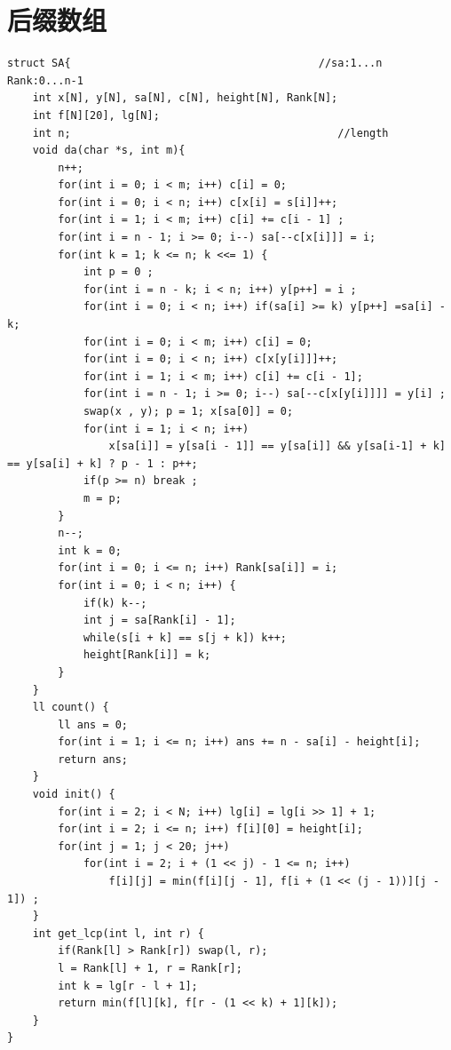 \documentclass[a4paper,11pt,twoside,fontset = fandol,UTF8]{ctexbook} %
\begin{document}
	\section{后缀数组}
	\begin{lstlisting}
struct SA{                                       //sa:1...n  Rank:0...n-1
    int x[N], y[N], sa[N], c[N], height[N], Rank[N];
    int f[N][20], lg[N];
    int n;                                          //length
    void da(char *s, int m){
        n++;
        for(int i = 0; i < m; i++) c[i] = 0;
        for(int i = 0; i < n; i++) c[x[i] = s[i]]++;
        for(int i = 1; i < m; i++) c[i] += c[i - 1] ;
        for(int i = n - 1; i >= 0; i--) sa[--c[x[i]]] = i;
        for(int k = 1; k <= n; k <<= 1) {
            int p = 0 ;
            for(int i = n - k; i < n; i++) y[p++] = i ;
            for(int i = 0; i < n; i++) if(sa[i] >= k) y[p++] =sa[i] - k;
            for(int i = 0; i < m; i++) c[i] = 0;
            for(int i = 0; i < n; i++) c[x[y[i]]]++;
            for(int i = 1; i < m; i++) c[i] += c[i - 1];
            for(int i = n - 1; i >= 0; i--) sa[--c[x[y[i]]]] = y[i] ;
            swap(x , y); p = 1; x[sa[0]] = 0;
            for(int i = 1; i < n; i++)
                x[sa[i]] = y[sa[i - 1]] == y[sa[i]] && y[sa[i-1] + k] == y[sa[i] + k] ? p - 1 : p++;
            if(p >= n) break ;
            m = p;
        }
        n--;
        int k = 0;
        for(int i = 0; i <= n; i++) Rank[sa[i]] = i;
        for(int i = 0; i < n; i++) {
            if(k) k--;
            int j = sa[Rank[i] - 1];
            while(s[i + k] == s[j + k]) k++;
            height[Rank[i]] = k;
        }
    }
    ll count() {
        ll ans = 0;
        for(int i = 1; i <= n; i++) ans += n - sa[i] - height[i];
        return ans;
    }
    void init() {
        for(int i = 2; i < N; i++) lg[i] = lg[i >> 1] + 1;
        for(int i = 2; i <= n; i++) f[i][0] = height[i];
        for(int j = 1; j < 20; j++)
            for(int i = 2; i + (1 << j) - 1 <= n; i++)
                f[i][j] = min(f[i][j - 1], f[i + (1 << (j - 1))][j - 1]) ;
    }
    int get_lcp(int l, int r) {
        if(Rank[l] > Rank[r]) swap(l, r);
        l = Rank[l] + 1, r = Rank[r];
        int k = lg[r - l + 1];
        return min(f[l][k], f[r - (1 << k) + 1][k]);
    }
}
	\end{lstlisting}
\end{document}
